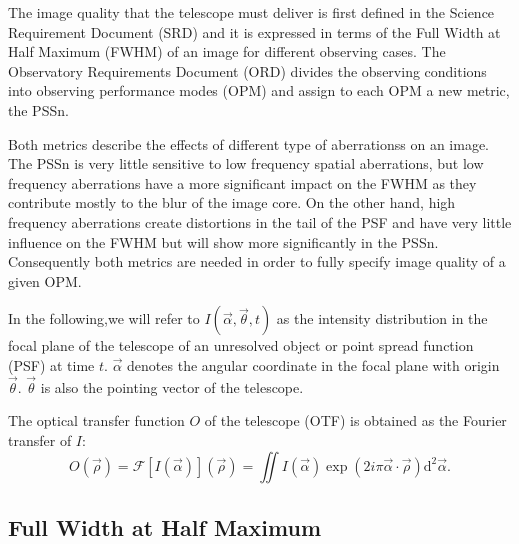 \documentclass{gmto}
\begin{document}
The image quality that the telescope must deliver is first defined in the
Science Requirement Document (SRD\cite{SRD}) and it is expressed in
terms of the Full Width at Half Maximum (FWHM) of an image for different observing cases.
The Observatory Requirements Document (ORD\cite{ORD}) divides the observing conditions
into observing performance modes (OPM) and assign to each OPM a new metric, the
PSSn\cite{SNA+2009}.

Both metrics describe the effects of different type of aberrationss on an image.
The PSSn is very little sensitive to low frequency spatial aberrations, but low frequency aberrations have a more significant impact on the FWHM
as they contribute mostly to the blur of the image core.
On the other hand, high frequency aberrations create distortions in the tail of
the PSF and have very little influence on the FWHM but will show more
significantly in the PSSn.
Consequently both metrics are needed in order to fully specify image quality of
a given OPM.

In the following,we will refer to $I(\vec\alpha,\vec \theta, t)$ as the
intensity distribution in the focal plane of the telescope of an unresolved
object or point spread function (PSF) at time $t$.
$\vec\alpha$ denotes the angular coordinate in the focal plane with origin
$\vec\theta$.
$\vec \theta$ is also the pointing vector of the telescope.

The optical transfer function $O$ of the telescope (OTF) is obtained as the Fourier transfer of
$I$:
\begin{equation}
  O(\vec\rho)=\mathcal{F}\left[ I(\vec\alpha) \right](\vec \rho) = \iint I(\vec\alpha) \exp\left( 2i\pi \vec\alpha\cdot\vec\rho \right)\mathrm{d}^2\vec\alpha.
  \label{eq:16}
\end{equation}

\subsection{Full Width at Half Maximum}
\label{sec:fwhm-def}
\end{document}
